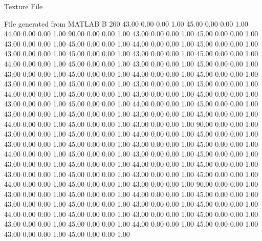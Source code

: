 Texture File

File generated from MATLAB
B 200
   43.00   0.00   0.00   1.00
   45.00   0.00   0.00   1.00
   44.00   0.00   0.00   1.00
   90.00   0.00   0.00   1.00
   43.00   0.00   0.00   1.00
   45.00   0.00   0.00   1.00
   43.00   0.00   0.00   1.00
   45.00   0.00   0.00   1.00
   44.00   0.00   0.00   1.00
   45.00   0.00   0.00   1.00
   43.00   0.00   0.00   1.00
   45.00   0.00   0.00   1.00
   43.00   0.00   0.00   1.00
   45.00   0.00   0.00   1.00
   44.00   0.00   0.00   1.00
   45.00   0.00   0.00   1.00
   43.00   0.00   0.00   1.00
   45.00   0.00   0.00   1.00
   43.00   0.00   0.00   1.00
   45.00   0.00   0.00   1.00
   44.00   0.00   0.00   1.00
   45.00   0.00   0.00   1.00
   43.00   0.00   0.00   1.00
   45.00   0.00   0.00   1.00
   43.00   0.00   0.00   1.00
   45.00   0.00   0.00   1.00
   44.00   0.00   0.00   1.00
   45.00   0.00   0.00   1.00
   43.00   0.00   0.00   1.00
   45.00   0.00   0.00   1.00
   43.00   0.00   0.00   1.00
   45.00   0.00   0.00   1.00
   44.00   0.00   0.00   1.00
   45.00   0.00   0.00   1.00
   43.00   0.00   0.00   1.00
   45.00   0.00   0.00   1.00
   43.00   0.00   0.00   1.00
   45.00   0.00   0.00   1.00
   44.00   0.00   0.00   1.00
   45.00   0.00   0.00   1.00
   43.00   0.00   0.00   1.00
   90.00   0.00   0.00   1.00
   43.00   0.00   0.00   1.00
   45.00   0.00   0.00   1.00
   44.00   0.00   0.00   1.00
   45.00   0.00   0.00   1.00
   43.00   0.00   0.00   1.00
   45.00   0.00   0.00   1.00
   43.00   0.00   0.00   1.00
   45.00   0.00   0.00   1.00
   44.00   0.00   0.00   1.00
   45.00   0.00   0.00   1.00
   43.00   0.00   0.00   1.00
   45.00   0.00   0.00   1.00
   43.00   0.00   0.00   1.00
   45.00   0.00   0.00   1.00
   44.00   0.00   0.00   1.00
   45.00   0.00   0.00   1.00
   43.00   0.00   0.00   1.00
   45.00   0.00   0.00   1.00
   43.00   0.00   0.00   1.00
   45.00   0.00   0.00   1.00
   44.00   0.00   0.00   1.00
   45.00   0.00   0.00   1.00
   43.00   0.00   0.00   1.00
   90.00   0.00   0.00   1.00
   43.00   0.00   0.00   1.00
   45.00   0.00   0.00   1.00
   44.00   0.00   0.00   1.00
   45.00   0.00   0.00   1.00
   43.00   0.00   0.00   1.00
   45.00   0.00   0.00   1.00
   43.00   0.00   0.00   1.00
   45.00   0.00   0.00   1.00
   44.00   0.00   0.00   1.00
   45.00   0.00   0.00   1.00
   43.00   0.00   0.00   1.00
   45.00   0.00   0.00   1.00
   43.00   0.00   0.00   1.00
   45.00   0.00   0.00   1.00
   44.00   0.00   0.00   1.00
   45.00   0.00   0.00   1.00
   43.00   0.00   0.00   1.00
   45.00   0.00   0.00   1.00
